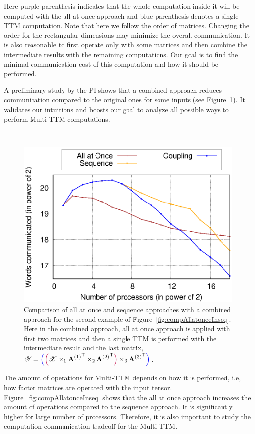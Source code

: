 \documentclass[a4paper,11pt]{article}
\newcommand{\X}{\T{X}}
\newcommand{\Y}{\T{Y}}
\newcommand{\allatoncecolor}{\color{purple}}
\newcommand{\seqcolor}{\color{blue}}
\newcommand{\allatoncestart}{{\allatoncecolor\Big(}}
\newcommand{\allatonceend}{{\allatoncecolor\Big)}}
\newcommand{\seqstart}{{\seqcolor\Big(}}
\newcommand{\seqend}{{\seqcolor\Big)}}
\begin{document}
	
	Here purple parenthesis indicates that the whole computation inside it will be computed with the all at once approach and blue parenthesis denotes a single TTM computation.  Note that here we follow the order of matrices. Changing the order for the rectangular dimensions may minimize the overall communication. It is also reasonable to first operate only with some matrices and then combine the intermediate results with the remaining computations. Our goal is to find the minimal communication cost of this computation and how it should be performed. 
	

	A preliminary study by the PI shows that a combined approach reduces communication compared to the original ones for some inputs (see Figure~\ref{fig:compCombinedAllatonceseq}). It validates our intuitions and boosts our goal to analyze all possible ways to perform  Multi-TTM computations.


~ 
\begin{figure}[htb]
	\begin{center}
		\includegraphics[width=0.45\linewidth]{./plots/AAO-vs-Seq-logscale-comparison-with-coup.eps}
		\caption{Comparison of all at once and sequence approaches with a combined approach for the second example of Figure~\ref{fig:compAllatonceInseq}. Here in the combined approach,  all at once approach is applied with first two matrices and then a single TTM is performed with the intermediate  result and the last matrix, $\Y = \seqstart\allatoncestart\X \times_1 {\Mn{A}{1}}^\Tra \times_2 {\Mn{A}{2}}^\Tra\allatonceend \times_3 {\Mn{A}{3}}^\Tra\seqend$. \label{fig:compCombinedAllatonceseq}}
	\end{center}		
\end{figure}
	

	
	
	
	The amount of operations for Multi-TTM depends on how it is performed, i.e, how factor matrices are operated with the input tensor. Figure~\ref{fig:compAllatonceInseq} shows that the all at once approach increases the amount of operations compared to the sequence approach. It is significantly higher for large number of processors. Therefore, it is also important to study the computation-communication tradeoff for the Multi-TTM. 
	
\end{document}
